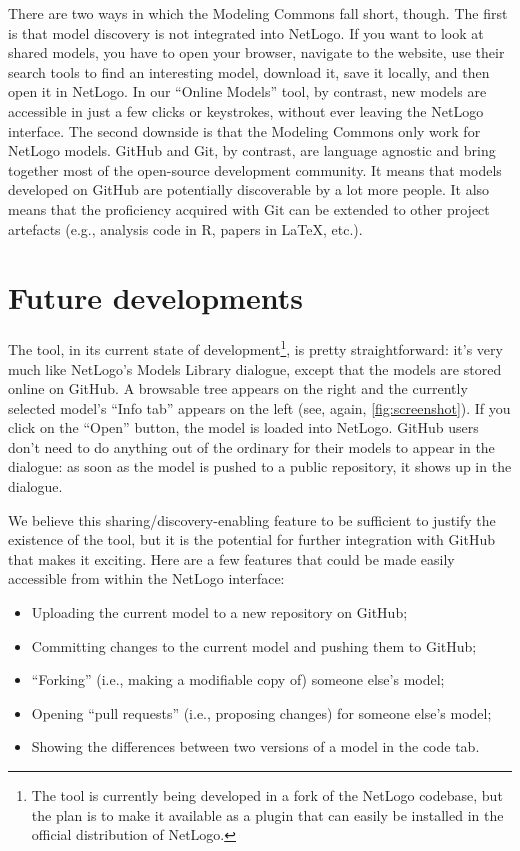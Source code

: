 \documentclass[runningheads]{llncs}
\begin{document}
There are two ways in which the Modeling Commons fall short, though. The first is that model discovery is not integrated into NetLogo. If you want to look at shared models, you have to open your browser, navigate to the website, use their search tools to find an interesting model, download it, save it locally, and then open it in NetLogo. In our ``Online Models'' tool, by contrast, new models are accessible in just a few clicks or keystrokes, without ever leaving the NetLogo interface. The second downside is that the Modeling Commons only work for NetLogo models. GitHub and Git, by contrast, are language agnostic and bring together most of the open-source development community. It means that models developed on GitHub are potentially discoverable by a lot more people. It also means that the proficiency acquired with Git can be extended to other project artefacts (e.g., analysis code in R, papers in \LaTeX, etc.).

\section{Future developments}

The tool, in its current state of development\footnote{The tool is currently being developed in a fork of the NetLogo codebase\cite{payette_netlogo_2019}, but the plan is to make it available as a plugin that can easily be installed in the official distribution of NetLogo.}, is pretty straightforward: it's very much like NetLogo's Models Library dialogue, except that the models are stored online on GitHub. A browsable tree appears on the right and the currently selected model's ``Info tab'' appears on the left (see, again, \cref{fig:screenshot}). If you click on the ``Open'' button, the model is loaded into NetLogo. GitHub users don't need to do anything out of the ordinary for their models to appear in the dialogue: as soon as the model is pushed to a public repository, it shows up in the dialogue.

We believe this sharing/discovery-enabling feature to be sufficient to justify the existence of the tool, but it is the potential for further integration with GitHub that makes it exciting. Here are a few features that could be made easily accessible from within the NetLogo interface:

\begin{itemize}
  \item Uploading the current model to a new repository on GitHub;
  \item Committing changes to the current model and pushing them to GitHub;
  \item ``Forking'' (i.e., making a modifiable copy of) someone else's model;
  \item Opening ``pull requests'' (i.e., proposing changes) for someone else's model;
  \item Showing the differences between two versions of a model in the code tab.
\end{itemize}
\end{document}
